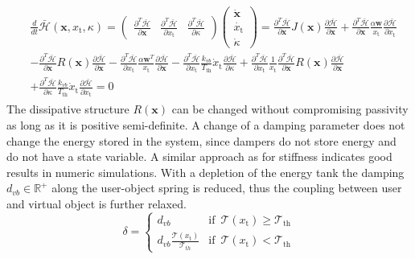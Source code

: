 \documentclass[a4paper,twoside, openright,12pt]{report}
\newcommand{\f}[1]{\boldsymbol{#1}}
\newcommand{\g}[1]{\text{#1}}
\begin{document}
\begin{eqnarray}
\begin{aligned}
&\frac{d}{dt}\bar{\mathcal{H}}(\f{x},x_\g{t},\kappa) = 
\begin{pmatrix}
\frac{\partial^T \bar{\mathcal{H}}}{\partial \f{x}} & \frac{\partial^T \bar{\mathcal{H}}}{\partial x_\g{t}} &
\frac{\partial^T \bar{\mathcal{H}}}{\partial \kappa}
\end{pmatrix}
\begin{pmatrix}
\dot{\f{x}} \\ \dot{x_\g{t}} \\ \dot{\kappa}
\end{pmatrix}
= \frac{\partial^T \bar{\mathcal{H}}}{\partial \f{x}}J(\f{x})\frac{\partial \bar{\mathcal{H}}}{\partial \f{x}} + \frac{\partial^T \bar{\mathcal{H}}}{\partial \f{x}}\frac{\alpha \f{w}}{x_\g{t}}\frac{\partial \bar{\mathcal{H}}}{\partial x_\g{t}} 
\\
&-\frac{\partial^T \bar{\mathcal{H}}}{\partial \f{x}}R(\f{x})\frac{\partial \bar{\mathcal{H}}}{\partial \f{x}} -\frac{\partial^T \bar{\mathcal{H}}}{\partial x_\g{t}}\frac{\alpha \f{w}^T}{x_\g{t}} \frac{\partial \bar{\mathcal{H}}}{\partial \f{x}} - \frac{\partial^T \bar{\mathcal{H}}}{\partial x_\g{t}}\frac{k_{vb}}{T_{\g{th}}}\dot{x}_\g{t} \frac{\partial \bar{\mathcal{H}}}{\partial \kappa}   + \frac{\partial^T \bar{\mathcal{H}}}{\partial x_\g{t}}\frac{1}{x_\g{t}}\frac{\partial^T \bar{\mathcal{H}}}{\partial \f{x}}R(\f{x})\frac{\partial \bar{\mathcal{H}}}{\partial \f{x}} 
  \\
 &+ \frac{\partial^T \bar{\mathcal{H}}}{\partial \kappa} \frac{k_{vb}}{T_{\g{th}}}\dot{x}_\g{t} \frac{\partial \bar{\mathcal{H}}}{\partial x_\g{t}}= 0
\end{aligned}
\end{eqnarray}
The dissipative structure $R(\f{x})$ can be changed without compromising passivity as long as it is positive semi-definite. A change of a damping parameter does not change the energy stored in the system, since dampers do not store energy and do not have a state variable. A similar approach as for stiffness indicates good results in numeric simulations. With a depletion of the energy tank the damping $d_{vb} \in \mathbb{R}^+$ along the user-object spring is reduced, thus the coupling between user and virtual object is further relaxed.
\begin{equation}
\delta = \begin{cases}
d_{vb} & \text{if } \, \mathcal{T}(x_\g{t})\geq \mathcal{T}_{\g{th}} \\
d_{vb} \frac{\mathcal{T}(x_\g{t})}{\mathcal{T}_{th}} & \text{if } \, \mathcal{T}(x_\g{t}) < \mathcal{T}_{\g{th}}
\end{cases}
\end{equation} 
\end{document}
